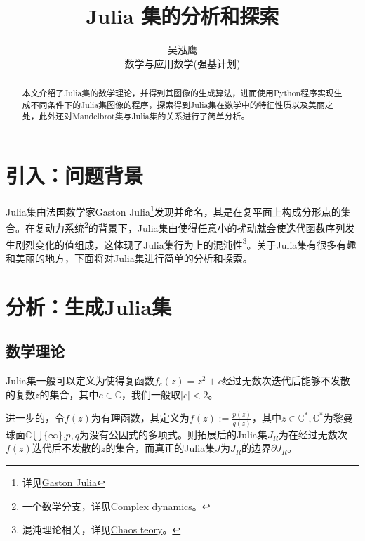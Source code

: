 \documentclass[a4paper]{ctexart}
\author{吴泓鹰\\数学与应用数学(强基计划)\quad3210101890}
\title{\textbf{Julia 集的分析和探索}}
\begin{document}
\maketitle

\begin{abstract}
	本文介绍了Julia集的数学理论，并得到其图像的生成算法，进而使用Python程序实现生成不同条件下的Julia集图像的程序，探索得到Julia集在数学中的特征性质以及美丽之处，此外还对Mandelbrot集与Julia集的关系进行了简单分析。
\end{abstract}

\section{引入：问题背景}
Julia集由法国数学家Gaston Julia\footnote{详见\href{https://en.wikipedia.org/wiki/Gaston_Julia。}{Gaston Julia}}发现并命名，其是在复平面上构成分形点的集合。在复动力系统\footnote{一个数学分支，详见\href{https://en.wikipedia.org/wiki/Complex_dynamics}{Complex dynamics}。}的背景下，Julia集由使得任意小的扰动就会使迭代函数序列发生剧烈变化的值组成，这体现了Julia集行为上的混沌性\footnote{混沌理论相关，详见\href{https://en.wikipedia.org/wiki/Chaos_theory}{Chaos teory}。}。关于Julia集有很多有趣和美丽的地方，下面将对Julia集进行简单的分析和探索。\cite{julia_wiki}

\section{分析：生成Julia集}

\subsection{数学理论}
Julia集一般可以定义为使得复函数$f_c(z)=z^2+c$经过无数次迭代后能够不发散的复数$z$的集合，其中$c\in\mathbb{C}$，我们一般取$|c|<2$。\cite{julia_Ju}

进一步的，令$f(z)$为有理函数，其定义为$\displaystyle f(z):=\frac{p(z)}{q(z)}$，其中$z\in\mathbb{C}^*,\mathbb{C}^*$为黎曼球面$\mathbb{C}\bigcup\{\infty\}$,$p,q$为没有公因式的多项式。则拓展后的Julia集$J_R$为在经过无数次$f(z)$迭代后不发散的$z$的集合，而真正的Julia集$J$为$J_R$的边界$\partial J_R$。\cite{julia_wolfram}
\end{document}
